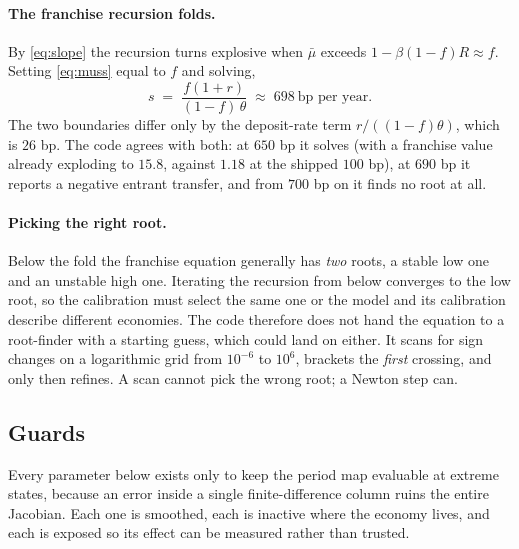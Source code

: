 \documentclass[10pt,a4paper]{article}
\theoremstyle{plain}
\theoremstyle{remark}
\begin{document}
\paragraph{The franchise recursion folds.} By \eqref{eq:slope} the recursion turns explosive when
$\bar\mu$ exceeds $1-\beta(1-f)R \approx f$. Setting \eqref{eq:muss} equal to $f$ and solving,
\begin{equation}
  s \;=\; \frac{f(1+r)}{(1-f)\,\theta} \;\approx\; 698\ \text{bp per year}.
\end{equation}
The two boundaries differ only by the deposit-rate term $r/((1-f)\theta)$, which is $26$ bp. The code
agrees with both: at $650$ bp it solves (with a franchise value already exploding to $15.8$, against
$1.18$ at the shipped $100$ bp), at $690$ bp it reports a negative entrant transfer, and from $700$ bp
on it finds no root at all.

\paragraph{Picking the right root.} Below the fold the franchise equation generally has \emph{two}
roots, a stable low one and an unstable high one. Iterating the recursion from below converges to the
low root, so the calibration must select the same one or the model and its calibration describe
different economies. The code therefore does not hand the equation to a root-finder with a starting
guess, which could land on either. It scans for sign changes on a logarithmic grid from $10^{-6}$ to
$10^{6}$, brackets the \emph{first} crossing, and only then refines. A scan cannot pick the wrong
root; a Newton step can.

\subsection{Guards}

Every parameter below exists only to keep the period map evaluable at extreme states, because an
error inside a single finite-difference column ruins the entire Jacobian. Each one is smoothed, each
is inactive where the economy lives, and each is exposed so its effect can be measured rather than
trusted.
\end{document}

